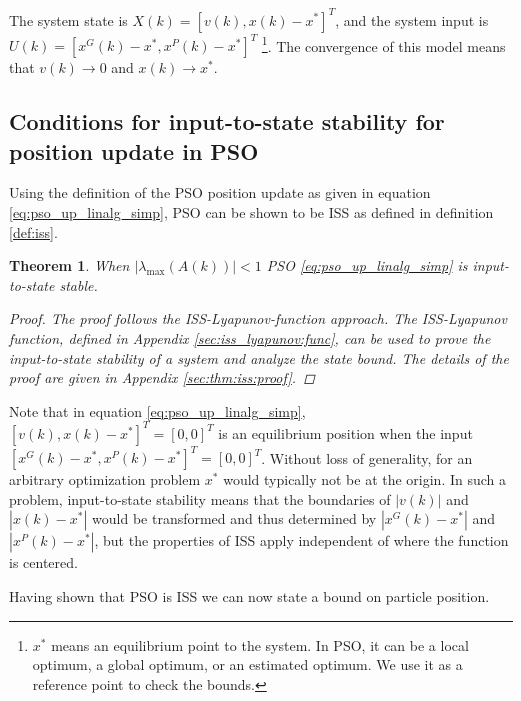 \documentclass{sig-alternate}
\newtheorem{mythm}{Theorem}
\begin{document}
The system state is $ X(k) = [ v(k), x(k) - x^{*} ]^{T} $, and the system input is $ U(k) = [ x^{G}(k) - x^{*} , x^{P}(k) - x^{*} ]^{T} $
\footnote{$ x^{*} $ means an equilibrium point to the system.
In PSO, it can be a local optimum, a global optimum, or an estimated optimum.
We use it as a reference point to check the bounds.}.
The convergence of this model means that $ v(k) \rightarrow 0 $ and $ x(k) \rightarrow x^{*} $.

\subsection{Conditions for input-to-state stability for position update in PSO}
\label{sec:iss_proof}

Using the definition of the PSO position update as given in equation \eqref{eq:pso_up_linalg_simp}, PSO can be shown to be ISS as defined in definition \ref{def:iss}.

\begin{mythm}
\label{thm:iss}
When $ | \lambda_{\max} ( A(k) ) | < 1 $ PSO \eqref{eq:pso_up_linalg_simp} is input-to-state stable. 
\begin{proof}
The proof follows the ISS-Lyapunov-function approach. 
The ISS-Lyapunov function, defined in Appendix \ref{sec:iss_lyapunov:func}, can be used to prove the input-to-state stability of a system and analyze the state bound\cite{Jiang2001857}.
The details of the proof are given in Appendix \ref{sec:thm:iss:proof}.
\end{proof}
\end{mythm}

Note that in equation \eqref{eq:pso_up_linalg_simp},
$ [ v(k), x(k) - x^{*} ]^{T} = [0, 0]^{T} $ is an equilibrium position when the input $ [ x^{G}(k) - x^{*} , x^{P}(k) - x^{*} ]^{T} = [0, 0]^{T} $.
Without loss of generality, for an arbitrary optimization problem $ x^{*} $ would typically not be at the origin. 
In such a problem, input-to-state stability means that the boundaries of $ | v(k) | $ and $ | x(k) - x^{*} | $ would be transformed and thus determined by $ | x^{G}(k) - x^{*} | $ and $ | x^{P}(k) - x^{*} | $,
but the properties of ISS apply independent of where the function is centered.

Having shown that PSO is ISS we can now state a bound on particle position.
\end{document}
